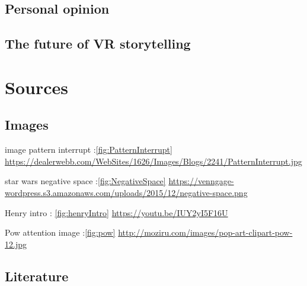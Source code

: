 \documentclass{report}
\begin{document}
				\section{Personal opinion}
				
				\section{The future of VR storytelling}
				
				\chapter{Sources}
				
				\section{Images}
				
				
				image pattern interrupt :\ref{fig:PatternInterrupt} \href{https://dealerwebb.com/WebSites/1626/Images/Blogs/2241/PatternInterrupt.jpg}{https://dealerwebb.com/WebSites/1626/Images/Blogs/2241/PatternInterrupt.jpg}
				
				star wars negative space :\ref{fig:NegativeSpace} \href{https://venngage-wordpress.s3.amazonaws.com/uploads/2015/12/negative-space.png}{https://venngage-wordpress.s3.amazonaws.com/uploads/2015/12/negative-space.png}
				
				Henry intro : \ref{fig:henryIntro} \href{https://youtu.be/IUY2yI5F16U}{https://youtu.be/IUY2yI5F16U}
				
				Pow attention image :\ref{fig:pow}
				\href{http://moziru.com/images/pop-art-clipart-pow-12.jpg}{http://moziru.com/images/pop-art-clipart-pow-12.jpg}
				
				\section{Literature}
				
				
		
\end{document}
